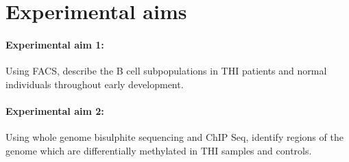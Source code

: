 \documentclass[12pt]{article}
\newcommand{\naive}{na\"{i}ve }
\begin{document}
%
%		
%			
%		
%	
			
	\section{Experimental aims}
		
		\paragraph{Experimental aim 1:} Using FACS, describe the B cell subpopulations in THI patients and normal individuals throughout early development.
		
		
		\paragraph{Experimental aim 2:} Using whole genome bisulphite sequencing and ChIP Seq, identify regions of the genome which are differentially methylated in THI samples and controls.
		
\end{document}

